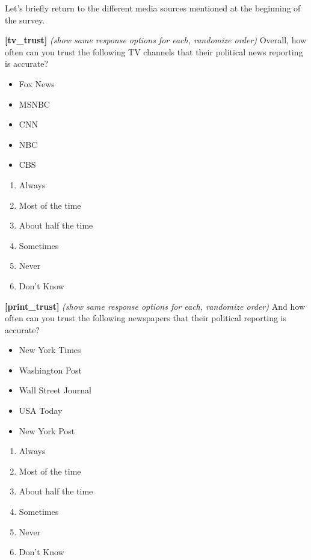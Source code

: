 \documentclass[]{article}
\providecommand{\tightlist}{%
  \setlength{\itemsep}{0pt}\setlength{\parskip}{0pt}}
\begin{document}
Let's briefly return to the different media sources mentioned at the
beginning of the survey.

\textbf{{[}tv\_trust{]}} \emph{(show same response options for each,
randomize order)} Overall, how often can you trust the following TV
channels that their political news reporting is accurate?

\begin{itemize}
\tightlist
\item
  Fox News
\item
  MSNBC
\item
  CNN
\item
  NBC
\item
  CBS
\end{itemize}

\begin{enumerate}
\def\labelenumi{\arabic{enumi}.}
\tightlist
\item
  Always
\item
  Most of the time
\item
  About half the time
\item
  Sometimes
\item
  Never
\item
  Don't Know
\end{enumerate}

\textbf{{[}print\_trust{]}} \emph{(show same response options for each,
randomize order)} And how often can you trust the following newspapers
that their political reporting is accurate?

\begin{itemize}
\tightlist
\item
  New York Times
\item
  Washington Post
\item
  Wall Street Journal
\item
  USA Today
\item
  New York Post
\end{itemize}

\begin{enumerate}
\def\labelenumi{\arabic{enumi}.}
\tightlist
\item
  Always
\item
  Most of the time
\item
  About half the time
\item
  Sometimes
\item
  Never
\item
  Don't Know
\end{enumerate}
\end{document}
